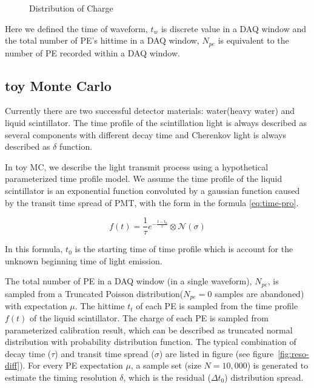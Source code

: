 \begin{minipage}[b]{1.\textwidth}
\begin{figure}[H]
    \centering
    \scalebox{0.4}{}
    \caption{\label{fig:charge} Distribution of Charge}
\end{figure}
\end{minipage}

Here we defined the time of waveform, $t_{w}$ is discrete value in a DAQ window and the total number of PE's hittime in a DAQ window, $N_{pe}$ is equivalent to the number of PE recorded within a DAQ window. 

\subsection{toy Monte Carlo}

Currently there are two successful detector materials: water(heavy water) and liquid scintillator. The time profile of the scintillation light is always described as several components with different decay time and Cherenkov light is always described as $\delta$ function\cite{ludhova_particle_2020}. 

In toy MC, we describe the light transmit process using a hypothetical parameterized time profile model. We assume the time profile of the liquid scintillator is an exponential function convoluted by a gaussian function\cite{li_separation_2016} caused by the transit time spread of PMT, with the form in the formula \eqref{eq:time-pro}. 

\begin{equation}
    f(t) = \frac{1}{\tau}e^{-\frac{t - t_{0}}{\tau}} \otimes \mathcal{N}(\sigma)
    \label{eq:time-pro}
\end{equation}

In this formula, $t_{0}$ is the starting time of time profile which is account for the unknown beginning time of light emission. 

The total number of PE in a DAQ window (in a single waveform), $N_{pe}$, is sampled from a Truncated Poisson distribution($N_{pe}=0$ samples are abandoned) with expectation $\mu$. The hittime $t_{t}$ of each PE is sampled from the time profile $f(t)$ of the liquid scintillator. The charge of each PE is sampled from parameterized calibration result, which can be described as truncated normal distribution with probability distribution function. The typical combination of decay time ($\tau$) and transit time spread ($\sigma$) are listed in figure (see figure~\ref{fig:reso-diff}). For every PE expectation $\mu$, a sample set (size $N=10,000$) is generated to estimate the timing resolution $\delta$, which is the residual ($\Delta t_{0}$) distribution spread. 

